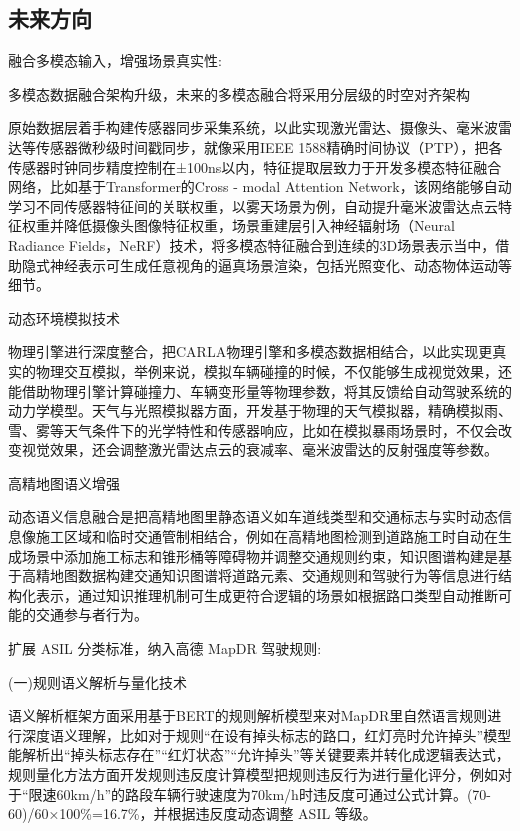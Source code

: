 \subsection{未来方向}

融合多模态输入，增强场景真实性:


多模态数据融合架构升级，未来的多模态融合将采用分层级的时空对齐架构

原始数据层着手构建传感器同步采集系统，以此实现激光雷达、摄像头、毫米波雷达等传感器微秒级时间戳同步，就像采用IEEE 1588精确时间协议（PTP），把各传感器时钟同步精度控制在±100ns以内，特征提取层致力于开发多模态特征融合网络，比如基于Transformer的Cross - modal Attention Network，该网络能够自动学习不同传感器特征间的关联权重，以雾天场景为例，自动提升毫米波雷达点云特征权重并降低摄像头图像特征权重，场景重建层引入神经辐射场（Neural Radiance Fields，NeRF）技术，将多模态特征融合到连续的3D场景表示当中，借助隐式神经表示可生成任意视角的逼真场景渲染，包括光照变化、动态物体运动等细节\cite{靳小波0基于机器学习算法的文本分类系统}。


动态环境模拟技术

物理引擎进行深度整合，把CARLA物理引擎和多模态数据相结合，以此实现更真实的物理交互模拟，举例来说，模拟车辆碰撞的时候，不仅能够生成视觉效果，还能借助物理引擎计算碰撞力、车辆变形量等物理参数，将其反馈给自动驾驶系统的动力学模型。天气与光照模拟器方面，开发基于物理的天气模拟器，精确模拟雨、雪、雾等天气条件下的光学特性和传感器响应，比如在模拟暴雨场景时，不仅会改变视觉效果，还会调整激光雷达点云的衰减率、毫米波雷达的反射强度等参数。


高精地图语义增强

动态语义信息融合是把高精地图里静态语义如车道线类型和交通标志与实时动态信息像施工区域和临时交通管制相结合，例如在高精地图检测到道路施工时自动在生成场景中添加施工标志和锥形桶等障碍物并调整交通规则约束，知识图谱构建是基于高精地图数据构建交通知识图谱将道路元素、交通规则和驾驶行为等信息进行结构化表示，通过知识推理机制可生成更符合逻辑的场景如根据路口类型自动推断可能的交通参与者行为\cite{ke2017lightgbm}。


扩展 ASIL 分类标准，纳入高德 MapDR 驾驶规则:


(一)规则语义解析与量化技术

语义解析框架方面采用基于BERT的规则解析模型来对MapDR里自然语言规则进行深度语义理解，比如对于规则“在设有掉头标志的路口，红灯亮时允许掉头”模型能解析出“掉头标志存在”“红灯状态”“允许掉头”等关键要素并转化成逻辑表达式，规则量化方法方面开发规则违反度计算模型把规则违反行为进行量化评分，例如对于“限速60km/h”的路段车辆行驶速度为70km/h时违反度可通过公式计算。(70-60)/60×100\%=16.7\%，并根据违反度动态调整 ASIL 等级\cite{刘彧祺2019基于}。


